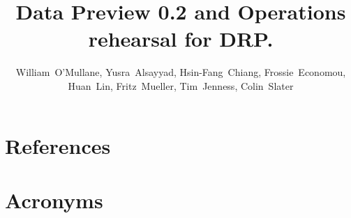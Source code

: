 \documentclass[OPS,authoryear,toc]{lsstdoc}
\title{Data Preview 0.2 and Operations rehearsal for DRP.}
\author{%
William~O'Mullane,
Yusra~Alsayyad,
Hsin-Fang~Chiang,
Frossie~Economou,
Huan~Lin,
Fritz~Mueller,
Tim~Jenness,
Colin~Slater
}
\date{\vcsDate}
\begin{document}
\maketitle


\appendix
\section{References} \label{sec:bib}
\renewcommand{\refname}{} %


\section{Acronyms} \label{sec:acronyms}

\end{document}
